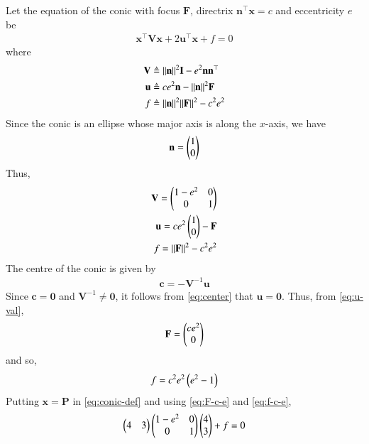 \documentclass[journal,12pt,twocolumn]{IEEEtran}
\renewcommand{\vec}[1]{\boldsymbol{\mathbf{#1}}}
\begin{document}
\begin{enumerate}
    \solution Let the equation of the conic with focus $\vec{F}$, directrix
    $\vec{n}^\top\vec{x} = c$ and eccentricity $e$ be
    \begin{align}
        \vec{x}^\top\vec{V}\vec{x} + 2\vec{u}^\top\vec{x} + f = 0
        \label{eq:conic-def}
    \end{align}
    where
    \begin{align}
        \vec{V} &\triangleq \norm{\vec{n}}^2\vec{I} - e^2\vec{n}\vec{n}^\top \label{eq:V-def} \\
        \vec{u} &\triangleq ce^2\vec{n} - \norm{\vec{n}}^2\vec{F} \label{eq:u-def} \\
        f &\triangleq \norm{\vec{n}}^2\norm{\vec{F}}^2 - c^2e^2 \label{eq:f-def}
    \end{align}
    Since the conic is an ellipse whose major axis is along the $x$-axis, we have
    \begin{align}
        \vec{n} = \myvec{1\\0}
    \end{align}
    Thus,
    \begin{align}
        \vec{V} = \myvec{1-e^2&0\\0&1} \label{eq:V-val} \\
        \vec{u} = ce^2\myvec{1\\0} - \vec{F} \label{eq:u-val} \\
        f = \norm{\vec{F}}^2 - c^2e^2 \label{eq:f-val}
    \end{align}
    The centre of the conic is given by
    \begin{align}
        \vec{c} = -\vec{V}^{-1}\vec{u}
        \label{eq:center}
    \end{align}
    Since $\vec{c} = \vec{0}$ and $\vec{V}^{-1} \neq \vec{0}$, it follows from 
    \eqref{eq:center} that $\vec{u} = \vec{0}$. Thus, from \eqref{eq:u-val},
    \begin{align}
        \vec{F} = \myvec{ce^2\\0}
        \label{eq:F-c-e}
    \end{align}
    and so,
    \begin{align}
        f = c^2e^2\left(e^2-1\right)
        \label{eq:f-c-e}
    \end{align}
    Putting $\vec{x} = \vec{P}$ in \eqref{eq:conic-def} and using \eqref{eq:F-c-e}
    and \eqref{eq:f-c-e},
    \begin{align}
        \myvec{4&3}\myvec{1-e^2&0\\0&1}\myvec{4\\3} + f &= 0 \\

\end{align}
\end{enumerate}
\end{document}
